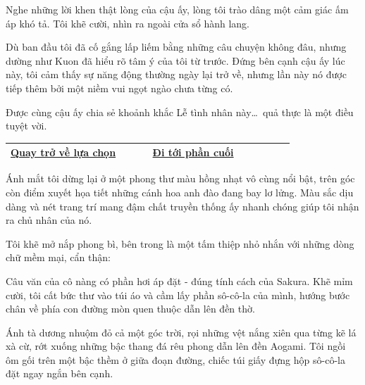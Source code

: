 \documentclass[../main.tex]{subfiles}
\begin{document}
Nghe những lời khen thật lòng của cậu ấy, lòng tôi trào dâng một cảm giác ấm áp khó tả. Tôi khẽ cười, nhìn ra ngoài cửa sổ hành lang.

Dù ban đầu tôi đã cố gắng lấp liếm bằng những câu chuyện không đâu, nhưng dường như Kuon đã hiểu rõ tâm ý của tôi từ trước. Đứng bên cạnh cậu ấy lúc này, tôi cảm thấy sự năng động thường ngày lại trở về, nhưng lần này nó được tiếp thêm bởi một niềm vui ngọt ngào chưa từng có.

Được cùng cậu ấy chia sẻ khoảnh khắc Lễ tình nhân này\dots\ quả thực là một điều tuyệt vời.

\begin{table}[H]
  \centering
  \setlength{\arrayrulewidth}{1pt}
  \begin{tabular}{|>{\centering\arraybackslash}p{0.4\linewidth}|>{\centering\arraybackslash}p{0.4\linewidth}|}
    \hline
    \hyperref[choice]{Quay trở về lựa chọn} & \hyperref[ending]{Đi tới phần cuối} \\ \hline
  \end{tabular}
\end{table}

\newpage
\label{sakura}

Ánh mắt tôi dừng lại ở một phong thư màu hồng nhạt vô cùng nổi bật, trên góc còn điểm xuyết họa tiết những cánh hoa anh đào đang bay lơ lửng. Màu sắc dịu dàng và nét trang trí mang đậm chất truyền thống ấy nhanh chóng giúp tôi nhận ra chủ nhân của nó.

Tôi khẽ mở nắp phong bì, bên trong là một tấm thiệp nhỏ nhắn với những dòng chữ mềm mại, cẩn thận:


Câu văn của cô nàng có phần hơi áp đặt - đúng tính cách của Sakura. Khẽ mỉm cười, tôi cất bức thư vào túi áo và cầm lấy phần sô-cô-la của mình, hướng bước chân về phía con đường mòn quen thuộc dẫn lên đền thờ.

\ct


Ánh tà dương nhuộm đỏ cả một góc trời, rọi những vệt nắng xiên qua từng kẽ lá xà cừ, rớt xuống những bậc thang đá rêu phong dẫn lên đền Aogami. Tôi ngồi ôm gối trên một bậc thềm ở giữa đoạn đường, chiếc túi giấy đựng hộp sô-cô-la đặt ngay ngắn bên cạnh.
\end{document}
